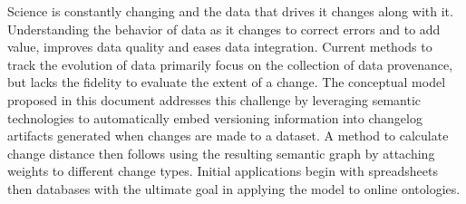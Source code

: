 

Science is constantly changing and the data that drives it changes along with it.
Understanding the behavior of data as it changes to correct errors and to add value, improves data quality and eases data integration.
Current methods to track the evolution of data primarily focus on the collection of data provenance, but lacks the fidelity to evaluate the extent of a change.
The conceptual model proposed in this document addresses this challenge by leveraging semantic technologies to automatically embed versioning information into changelog artifacts generated when changes are made to a dataset.
A method to calculate change distance then follows using the resulting semantic graph by attaching weights to different change types.
Initial applications begin with spreadsheets then databases with the ultimate goal in applying the model to online ontologies.